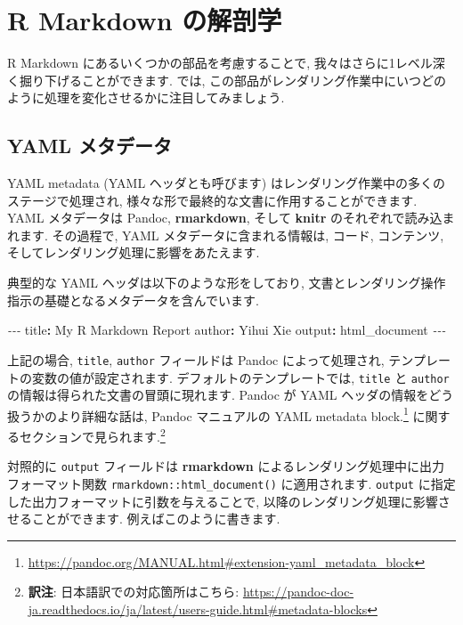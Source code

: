 \documentclass[
  11pt,
  lualatex,
  ja=standard]{bxjsreport}
\newenvironment{Shaded}{\begin{snugshade}}{\end{snugshade}}
\newcommand{\AttributeTok}[1]{\textcolor[rgb]{0.77,0.63,0.00}{#1}}
\newcommand{\FunctionTok}[1]{\textcolor[rgb]{0.00,0.00,0.00}{#1}}
\newcommand{\KeywordTok}[1]{\textcolor[rgb]{0.13,0.29,0.53}{\textbf{#1}}}
\newcommand{\PreprocessorTok}[1]{\textcolor[rgb]{0.56,0.35,0.01}{\textit{#1}}}
\renewcommand{\href}[2]{#2\footnote{\url{#1}}}
\begin{document}
\hypertarget{rmarkdown-anatomy}{%
\section{R Markdown の解剖学}\label{rmarkdown-anatomy}}

R Markdown にあるいくつかの部品を考慮することで, 我々はさらに1レベル深く掘り下げることができます. では, この部品がレンダリング作業中にいつどのように処理を変化させるかに注目してみましょう.

\hypertarget{yaml-metadata}{%
\subsection{YAML メタデータ}\label{yaml-metadata}}

YAML metadata (YAML ヘッダとも呼びます) はレンダリング作業中の多くのステージで処理され, 様々な形で最終的な文書に作用することができます. YAML メタデータは Pandoc, \textbf{rmarkdown}, そして \textbf{knitr} のそれぞれで読み込まれます. その過程で, YAML メタデータに含まれる情報は, コード, コンテンツ, そしてレンダリング処理に影響をあたえます.

典型的な YAML ヘッダは以下のような形をしており, 文書とレンダリング操作指示の基礎となるメタデータを含んでいます.

\begin{Shaded}
\begin{Highlighting}[]
\PreprocessorTok{{-}{-}{-}}
\FunctionTok{title}\KeywordTok{:}\AttributeTok{ My R Markdown Report}
\FunctionTok{author}\KeywordTok{:}\AttributeTok{ Yihui Xie}
\FunctionTok{output}\KeywordTok{:}\AttributeTok{ html\_document}
\PreprocessorTok{{-}{-}{-}}
\end{Highlighting}
\end{Shaded}

上記の場合, \texttt{title}, \texttt{author} フィールドは Pandoc によって処理され, テンプレートの変数の値が設定されます. デフォルトのテンプレートでは, \texttt{title} と \texttt{author} の情報は得られた文書の冒頭に現れます. Pandoc が YAML ヘッダの情報をどう扱うかのより詳細な話は, Pandoc マニュアルの \href{https://pandoc.org/MANUAL.html\#extension-yaml_metadata_block}{YAML metadata block.} に関するセクションで見られます.\footnote{\textbf{訳注}: 日本語訳での対応箇所はこちら: \url{https://pandoc-doc-ja.readthedocs.io/ja/latest/users-guide.html\#metadata-blocks}}

対照的に \texttt{output} フィールドは \textbf{rmarkdown} によるレンダリング処理中に出力フォーマット関数 \texttt{rmarkdown::html\_document()} に適用されます. \texttt{output} に指定した出力フォーマットに引数を与えることで, 以降のレンダリング処理に影響させることができます. 例えばこのように書きます.
\end{document}
